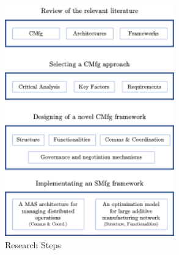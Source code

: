 \begin{figure}[h]
    \centering
    \includegraphics[height=10cm,keepaspectratio]{images/research-steps}
    \caption{Research Steps}
    \label{fig:research-steps}
\end{figure}
